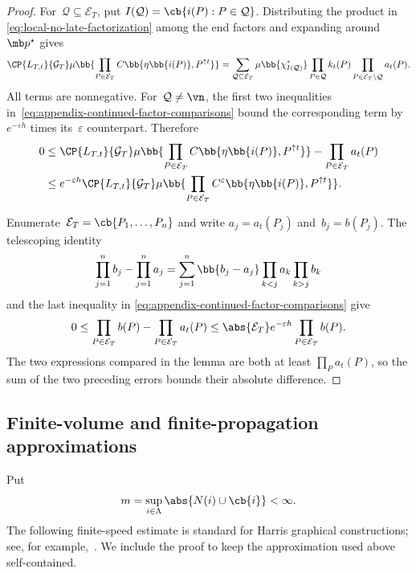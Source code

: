 \begin{proof}
For~$\mathcal Q\subseteq\mathcal E_T$, put
$I(\mathcal Q)=\cb{i(P):P\in\mathcal Q}$. Distributing the product in
\eqref{eq:local-no-late-factorization} among the end factors and expanding
around~$\mb p^\star$ gives
\begin{equation*}
\CP{L_{T,t}}{\mathcal G_T}
\mu\bb{
 \prod_{P\in\mathcal E_T}
 C\bb{\eta\bb{i(P)},P^{\uparrow t}}
} =
\sum_{\mathcal Q\subseteq\mathcal E_T}
\mu\bb{\chi_{I(\mathcal Q)}^*}
\prod_{P\in\mathcal Q}k_t(P)
\prod_{P\in\mathcal E_T\setminus\mathcal Q}a_t(P).
\end{equation*}
All terms are nonnegative. For~$\mathcal Q\neq\vn$, the first two inequalities
in~\eqref{eq:appendix-continued-factor-comparisons} bound the corresponding
term by~$e^{-\varepsilon h}$ times its~$\varepsilon$ counterpart. Therefore
\begin{align*}
0
&\leq
\CP{L_{T,t}}{\mathcal G_T}
\mu\bb{
 \prod_{P\in\mathcal E_T}
 C\bb{\eta\bb{i(P)},P^{\uparrow t}}
}
-
\prod_{P\in\mathcal E_T}a_t(P)
\\
&\leq
e^{-\varepsilon h}
\CP{L_{T,t}}{\mathcal G_T}
\mu\bb{
 \prod_{P\in\mathcal E_T}
 C^\varepsilon\bb{\eta\bb{i(P)},P^{\uparrow t}}
}.
\end{align*}

Enumerate~$\mathcal E_T=\cb{P_1,\ldots,P_n}$ and write
$a_j=a_t(P_j)$ and~$b_j=b(P_j)$. The telescoping identity
\begin{equation*}
\prod_{j=1}^n b_j-
\prod_{j=1}^n a_j
=
\sum_{j=1}^n
\bb{b_j-a_j}
\prod_{k<j}a_k
\prod_{k>j}b_k
\end{equation*}
and the last inequality in
\eqref{eq:appendix-continued-factor-comparisons} give
\begin{equation*}
0
\leq
\prod_{P\in\mathcal E_T}b(P)
-
\prod_{P\in\mathcal E_T}a_t(P)
\leq
\abs{\mathcal E_T}e^{-\varepsilon h}
\prod_{P\in\mathcal E_T}b(P).
\end{equation*}
The two expressions compared in the lemma are both at least
$\prod_Pa_t(P)$, so the sum of the two preceding errors bounds their absolute
difference.
\end{proof}

\subsection{Finite-volume and finite-propagation approximations}
\label{app:finite-propagation}

Put
\begin{equation*}
m=\sup_{i\in\Lambda}\abs{N(i)\cup\cb{i}}<\infty.
\end{equation*}
The following finite-speed estimate is standard for Harris graphical
constructions; see, for example,~\cite[Chapter~I]{Liggett1985}. We include the
proof to keep the approximation used above self-contained.

